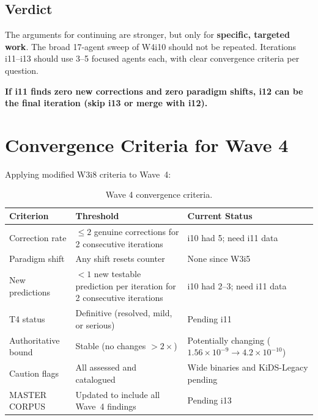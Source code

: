 \documentclass[11pt]{article}
\newcommand{\ee}[1]{\times 10^{#1}}
\begin{document}
\subsection{Verdict}

The arguments for continuing are stronger, but only for \textbf{specific,
targeted work}. The broad 17-agent sweep of W4i10 should not be repeated.
Iterations i11--i13 should use 3--5 focused agents each, with clear
convergence criteria per question.

\textbf{If i11 finds zero new corrections and zero paradigm shifts, i12
can be the final iteration (skip i13 or merge with i12).}


\section{Convergence Criteria for Wave 4}
\label{sec:criteria}

Applying modified W3i8 criteria to Wave~4:

\begin{table}[H]
\centering
\caption{Wave 4 convergence criteria.}
\begin{tabular}{lp{5cm}p{5cm}}
\toprule
\textbf{Criterion} & \textbf{Threshold} & \textbf{Current Status} \\
\midrule
Correction rate & $\leq 2$ genuine corrections for 2 consecutive iterations
  & i10 had 5; need i11 data \\
Paradigm shift & Any shift resets counter & None since W3i5 \\
New predictions & $< 1$ new testable prediction per iteration for 2
  consecutive iterations & i10 had 2--3; need i11 data \\
T4 status & Definitive (resolved, mild, or serious) & Pending i11 \\
Authoritative bound & Stable (no changes $> 2\times$) & Potentially
  changing ($1.56\ee{-9} \to 4.2\ee{-10}$) \\
Caution flags & All assessed and catalogued & Wide binaries and
  KiDS-Legacy pending \\
MASTER CORPUS & Updated to include all Wave~4 findings & Pending i13 \\
\bottomrule
\end{tabular}
\end{table}


\end{document}
